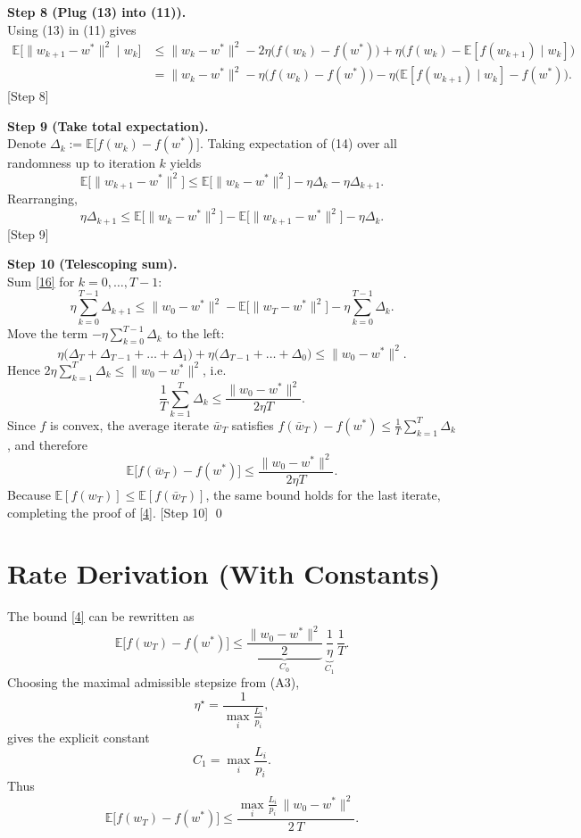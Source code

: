 \documentclass[11pt]{article}
\newcommand{\EE}{\mathbb{E}}
\begin{document}
\noindent\textbf{Step 8 (Plug (13) into (11)).}\\
Using (13) in (11) gives
\begin{align}
\EE\!\big[\|w_{k+1}-w^{*}\|^{2}\mid w_k\big]
&\le \|w_k-w^{*}\|^{2}
   -2\eta\big(f(w_k)-f(w^{*})\big)
   +\eta\big(f(w_k)-\EE[f(w_{k+1})\mid w_k]\big) \nonumber\\
&= \|w_k-w^{*}\|^{2}
   -\eta\big(f(w_k)-f(w^{*})\big)
   -\eta\big(\EE[f(w_{k+1})\mid w_k]-f(w^{*})\big).
\tag{14}
\end{align}
\hfill[Step 8]

\noindent\textbf{Step 9 (Take total expectation).}\\
Denote $\Delta_k:=\EE\big[f(w_k)-f(w^{*})\big]$.
Taking expectation of (14) over all randomness up to iteration $k$ yields
\[
\EE\!\big[\|w_{k+1}-w^{*}\|^{2}\big]
\le \EE\!\big[\|w_k-w^{*}\|^{2}\big]
      -\eta\Delta_k-\eta\Delta_{k+1}.
\tag{15}
\]
Rearranging,
\[
\eta\Delta_{k+1}\le \EE\!\big[\|w_k-w^{*}\|^{2}\big]
                     -\EE\!\big[\|w_{k+1}-w^{*}\|^{2}\big]
                     -\eta\Delta_k .
\tag{16}
\]
\hfill[Step 9]

\noindent\textbf{Step 10 (Telescoping sum).}\\
Sum \eqref{16} for $k=0,\dots,T-1$:
\[
\eta\sum_{k=0}^{T-1}\Delta_{k+1}
\le \|w_0-w^{*}\|^{2}
    -\EE\!\big[\|w_T-w^{*}\|^{2}\big]
    -\eta\sum_{k=0}^{T-1}\Delta_k .
\]
Move the term $-\eta\sum_{k=0}^{T-1}\Delta_k$ to the left:
\[
\eta\big(\Delta_T+\Delta_{T-1}+\dots+\Delta_1\big)
      +\eta\big(\Delta_{T-1}+\dots+\Delta_0\big)
\le \|w_0-w^{*}\|^{2}.
\]
Hence $2\eta\sum_{k=1}^{T}\Delta_k\le \|w_0-w^{*}\|^{2}$, i.e.
\[
\frac{1}{T}\sum_{k=1}^{T}\Delta_k\le\frac{\|w_0-w^{*}\|^{2}}{2\eta T}.
\tag{17}
\]
Since $f$ is convex, the average iterate $\bar w_T$ satisfies
$f(\bar w_T)-f(w^{*})\le\frac1T\sum_{k=1}^{T}\Delta_k$,
and therefore
\[
\EE\!\big[f(\bar w_T)-f(w^{*})\big]\le\frac{\|w_0-w^{*}\|^{2}}{2\eta T}.
\]
Because $\EE[f(w_T)]\le\EE[f(\bar w_T)]$, the same bound holds for the last iterate, completing the proof of \eqref{4}.
\hfill[Step 10] \qed

\section*{Rate Derivation (With Constants)}
The bound \eqref{4} can be rewritten as
\[
\EE\!\big[f(w_T)-f(w^{*})\big]\le
\underbrace{\frac{\|w_0-w^{*}\|^{2}}{2}}_{C_0}\,
\underbrace{\frac{1}{\eta}}_{C_1}\,\frac{1}{T}.
\]
Choosing the maximal admissible stepsize from (A3),
\[
\eta^{\star}= \frac{1}{\displaystyle\max_{i}\frac{L_i}{p_i}},
\]
gives the explicit constant
\[
C_1 = \max_{i}\frac{L_i}{p_i}.
\]
Thus
\[
\EE\!\big[f(w_T)-f(w^{*})\big]\le
\frac{\max_{i}\frac{L_i}{p_i}\,\|w_0-w^{*}\|^{2}}{2\,T}.
\]
\end{document}
